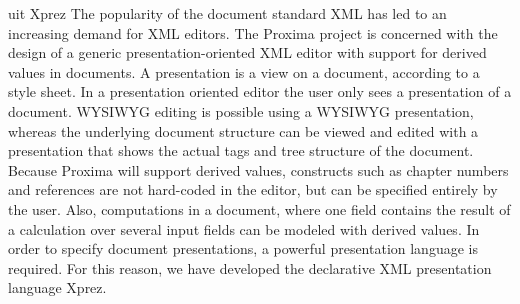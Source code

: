 \bc uit Xprez
The popularity of the document standard XML has led to an increasing demand for XML editors. The Proxima project is concerned with the design of a generic presentation-oriented XML editor with support for derived values in documents. A presentation is a view on a document, according to a style sheet. In a presentation oriented editor the user only sees a presentation of a document. WYSIWYG editing is possible using a WYSIWYG presentation, whereas the underlying document structure can be viewed and edited with a presentation that shows the actual tags and tree structure of the document. Because Proxima will support derived values, constructs such as chapter numbers and references are not hard-coded in the editor, but can be specified entirely by the user. Also, computations in a document, where one field contains the result of a calculation over several input fields can be modeled with derived values. In order to specify document presentations, a powerful presentation language is required. For this reason, we have developed the declarative XML presentation language {\sc Xprez}.
\ec




%
%
%
%
%







